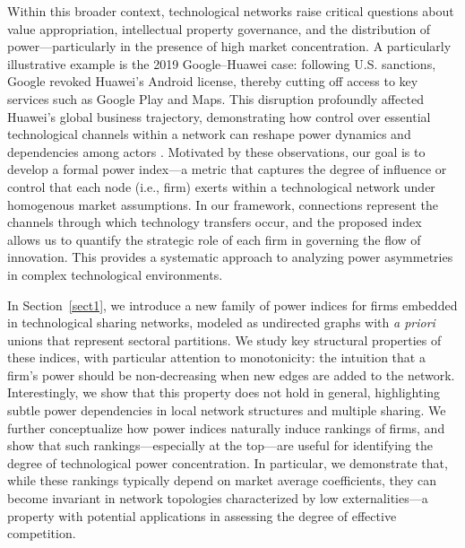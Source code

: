 \documentclass[preprint,11pt,authoryear]{elsarticle}
\theoremstyle{plain}
\begin{document}
Within this broader context, technological networks raise critical questions about value appropriation, intellectual property governance, and the distribution of power—particularly in the presence of high market concentration. A particularly illustrative example is the 2019 Google–Huawei case: following U.S. sanctions, Google revoked Huawei’s Android license, thereby cutting off access to key services such as Google Play and Maps. This disruption profoundly affected Huawei’s global business trajectory, demonstrating how control over essential technological channels within a network can reshape power dynamics and dependencies among actors \citep{gilsing2008network}.
Motivated by these observations, our goal is to develop a formal power index—a metric that captures the degree of influence or control that each node (i.e., firm) exerts within a technological network under homogenous market assumptions. In our framework, connections represent the channels through which technology transfers occur, and the proposed index allows us to quantify the strategic role of each firm in governing the flow of innovation. This provides a systematic approach to analyzing power asymmetries in complex technological environments.

In Section~\ref{sect1}, we introduce a new family of power indices for firms embedded in technological sharing networks, modeled as undirected graphs with \emph{a priori} unions that represent sectoral partitions. We study key structural properties of these indices, with particular attention to monotonicity: the intuition that a firm’s power should be non-decreasing when new edges are added to the network. Interestingly, we show that this property does not hold in general, highlighting subtle power dependencies in local network structures and multiple sharing. We further conceptualize how power indices naturally induce rankings of firms, and show that such rankings—especially at the top—are useful for identifying the degree of technological power concentration. In particular, we demonstrate that, while these rankings typically depend on market average coefficients, they can become invariant in network topologies characterized by low externalities—a property with potential applications in assessing the degree of effective competition. 
\end{document}
